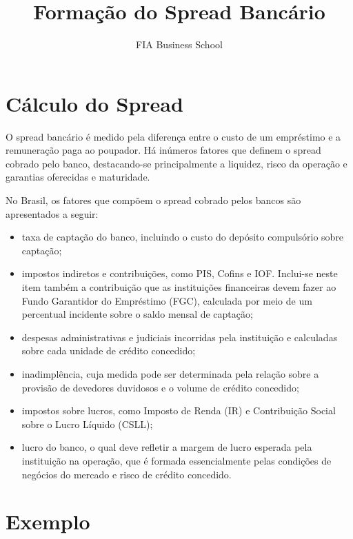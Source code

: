 \documentclass{article}\usepackage[]{graphicx}\usepackage[]{xcolor}
\title{Formação do Spread Bancário}
\author{FIA Business School}
\begin{document}
\maketitle

\section*{Cálculo do Spread}

O spread bancário é medido pela diferença entre o custo de um empréstimo e a remuneração paga ao poupador. 
Há inúmeros fatores que definem o spread cobrado pelo banco, destacando-se principalmente a liquidez, 
risco da operação e garantias oferecidas e maturidade.

No Brasil, os fatores que compõem o spread cobrado pelos bancos são apresentados a seguir:

\begin{itemize}

  \item taxa de captação do banco, incluindo o custo do depósito compulsório sobre captação;
  
  \item impostos indiretos e contribuições, como PIS, Cofins e IOF. Inclui-se neste item também a 
        contribuição que as instituições financeiras devem fazer ao Fundo Garantidor do Empréstimo 
        (FGC), calculada por meio de um percentual incidente sobre o saldo mensal de captação;
  
  \item despesas administrativas e judiciais incorridas pela instituição e calculadas sobre cada 
        unidade de crédito concedido;
        
  \item inadimplência, cuja medida pode ser determinada pela relação sobre a provisão de devedores 
        duvidosos e o volume de crédito concedido;
        
  \item impostos sobre lucros, como Imposto de Renda (IR) e Contribuição Social sobre o Lucro Líquido (CSLL);
  
  \item lucro do banco, o qual deve refletir a margem de lucro esperada pela instituição na operação, 
        que é formada essencialmente pelas condições de negócios do mercado e risco de crédito concedido.

\end{itemize}


\section*{Exemplo}
\end{document}
